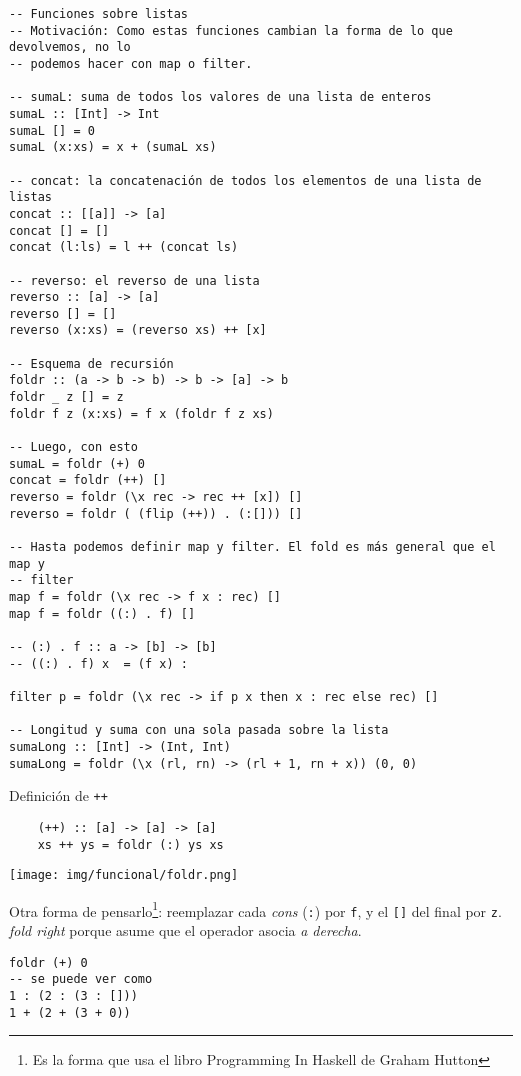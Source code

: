 \documentclass{report}
\theoremstyle{definition} %
\begin{document}
\begin{verbatim}
-- Funciones sobre listas
-- Motivación: Como estas funciones cambian la forma de lo que devolvemos, no lo
-- podemos hacer con map o filter.

-- sumaL: suma de todos los valores de una lista de enteros
sumaL :: [Int] -> Int
sumaL [] = 0
sumaL (x:xs) = x + (sumaL xs)

-- concat: la concatenación de todos los elementos de una lista de listas
concat :: [[a]] -> [a]
concat [] = []
concat (l:ls) = l ++ (concat ls)

-- reverso: el reverso de una lista
reverso :: [a] -> [a]
reverso [] = []
reverso (x:xs) = (reverso xs) ++ [x]

-- Esquema de recursión
foldr :: (a -> b -> b) -> b -> [a] -> b
foldr _ z [] = z
foldr f z (x:xs) = f x (foldr f z xs)

-- Luego, con esto
sumaL = foldr (+) 0
concat = foldr (++) []
reverso = foldr (\x rec -> rec ++ [x]) []
reverso = foldr ( (flip (++)) . (:[])) []

-- Hasta podemos definir map y filter. El fold es más general que el map y
-- filter
map f = foldr (\x rec -> f x : rec) []
map f = foldr ((:) . f) []

-- (:) . f :: a -> [b] -> [b]
-- ((:) . f) x  = (f x) :

filter p = foldr (\x rec -> if p x then x : rec else rec) []

-- Longitud y suma con una sola pasada sobre la lista
sumaLong :: [Int] -> (Int, Int)
sumaLong = foldr (\x (rl, rn) -> (rl + 1, rn + x)) (0, 0)
\end{verbatim}

Definición de \texttt{++}
\begin{verbatim}
    (++) :: [a] -> [a] -> [a]
    xs ++ ys = foldr (:) ys xs
\end{verbatim}

\begin{center}
    \texttt{[image: img/funcional/foldr.png]}
\end{center}

Otra forma de pensarlo\footnote{Es la forma que usa el libro Programming In
Haskell de Graham Hutton}: reemplazar cada \textit{cons} (\texttt{:}) por
\texttt{f}, y el \texttt{[]} del final por \texttt{z}. \textit{fold right}
porque asume que el operador asocia \textit{a derecha}.

\begin{verbatim}
foldr (+) 0
-- se puede ver como
1 : (2 : (3 : []))
1 + (2 + (3 + 0))
\end{verbatim}
\end{document}
